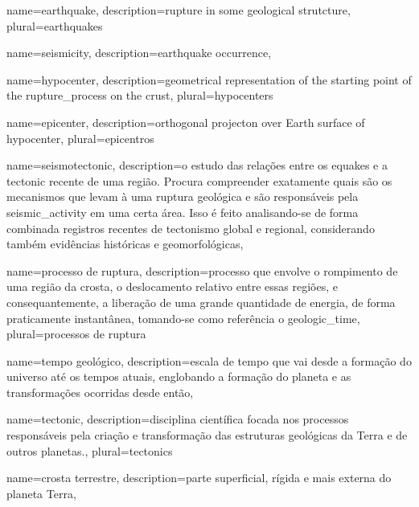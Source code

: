 {
	name={earthquake},
	description={rupture in some geological strutcture},
	plural={earthquakes}
}

{
	name={seismicity},
	description={earthquake occurrence},
}

{
	name={hypocenter},
	description={geometrical representation of the starting point of the \gls{rupture_process} on the \gls{crust}},
	plural={hypocenters}
}

{
	name={epicenter},
	description={orthogonal projecton over Earth surface of \gls{hypocenter}},
	plural={epicentros}
}


{
	name={seismotectonic},
	description={o estudo das relações entre os \glspl{equake} e a \gls{tectonic} recente de uma região.
				 Procura compreender exatamente quais são os mecanismos que levam à uma ruptura geológica 
				 e são responsáveis pela
				 \gls{seismic_activity} em uma certa área. Isso é feito analisando-se de forma combinada 
				 registros recentes de tectonismo global e regional, 
				 considerando também evidências históricas e geomorfológicas},
}


{
	name={processo de ruptura},
	description={processo que envolve o rompimento de uma região da crosta,
			o deslocamento relativo entre essas regiões, e consequantemente,
			a liberação de uma grande quantidade de energia, de forma praticamente
			instantânea, tomando-se como referência o \gls{geologic_time}},
	plural={processos de ruptura}
}


{
	name={tempo geológico},
	description={escala de tempo que vai desde a formação do universo até os tempos atuais,
				englobando a formação do planeta e as transformações ocorridas desde então},
}


{
	name={tectonic},
	description={disciplina científica focada nos processos respons\'aveis 
				 pela cria\c{c}\~ao e transforma\c{c}\~ao das estruturas geológicas da Terra e de outros planetas.},
	plural={tectonics}
}




{
	name={crosta terrestre},
	description={parte superficial, rígida e mais externa do planeta Terra},
}

